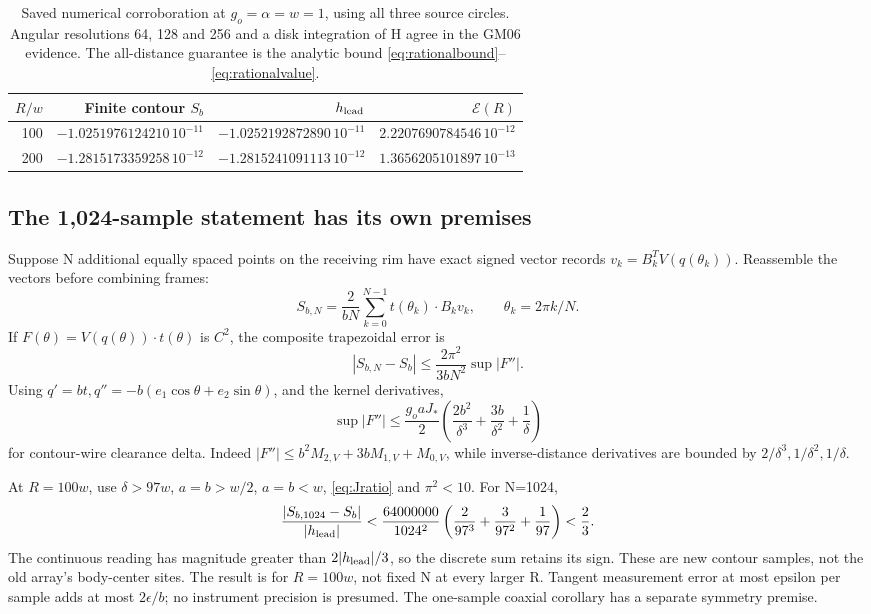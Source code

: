 \begin{table}[tbp]\centering\small
\begin{tabular}{@{}rrrr@{}}\toprule
\(R/w\)&Finite contour \(S_b\)&\(h_{\rm lead}\)&\(\mathcal E(R)\)\\\midrule
100&\(-1.0251976124210\,10^{-11}\)&\(-1.0252192872890\,10^{-11}\)&\(2.2207690784546\,10^{-12}\)\\
200&\(-1.2815173359258\,10^{-12}\)&\(-1.2815241091113\,10^{-12}\)&\(1.3656205101897\,10^{-13}\)\\\bottomrule
\end{tabular}
\caption{Saved numerical corroboration at \(g_o=\alpha=w=1\), using all three source circles. Angular resolutions 64, 128 and 256 and a disk integration of H agree in the GM06 evidence. The all-distance guarantee is the analytic bound \eqref{eq:rationalbound}--\eqref{eq:rationalvalue}.}\label{tab:native}
\end{table}

\subsection{The 1,024-sample statement has its own premises}
Suppose N additional equally spaced points on the receiving rim have exact signed vector records \(v_k=B_k^TV(q(\theta_k))\). Reassemble the vectors before combining frames:
\begin{equation}\label{eq:SN}
S_{b,N}=\frac{2}{bN}\sum_{k=0}^{N-1}t(\theta_k)\cdot B_kv_k,\qquad
\theta_k=2\pi k/N.
\end{equation}
If \(F(\theta)=V(q(\theta))\cdot t(\theta)\) is \(C^2\), the composite trapezoidal error is
\begin{equation}\label{eq:quadratureerror}
|S_{b,N}-S_b|\le\frac{2\pi^2}{3bN^2}\sup|F''|.
\end{equation}
Using \(q'=bt,q''=-b(e_1\cos\theta+e_2\sin\theta)\), and the kernel derivatives,
\begin{equation}\label{eq:Fsecond}
\sup|F''|\le\frac{g_oaJ_*}{2}
\left(\frac{2b^2}{\delta^3}+\frac{3b}{\delta^2}+\frac1\delta\right)
\end{equation}
for contour-wire clearance delta. Indeed \(|F''|\le b^2M_{2,V}+3bM_{1,V}+M_{0,V}\), while inverse-distance derivatives are bounded by \(2/\delta^3,1/\delta^2,1/\delta\).

At \(R=100w\), use \(\delta>97w\), \(a=b>w/2\), \(a=b<w\), \eqref{eq:Jratio} and \(\pi^2<10\). For N=1024,
\begin{equation}\label{eq:1024}
\frac{|S_{b,1024}-S_b|}{|h_{\rm lead}|}
<
\frac{64000000}{1024^2}
\left(\frac2{97^3}+\frac3{97^2}+\frac1{97}\right)<\frac23.
\end{equation}
The continuous reading has magnitude greater than \(2|h_{\rm lead}|/3\), so the discrete sum retains its sign. These are new contour samples, not the old array's body-center sites. The result is for \(R=100w\), not fixed N at every larger R. Tangent measurement error at most epsilon per sample adds at most \(2\epsilon/b\); no instrument precision is presumed. The one-sample coaxial corollary has a separate symmetry premise.

